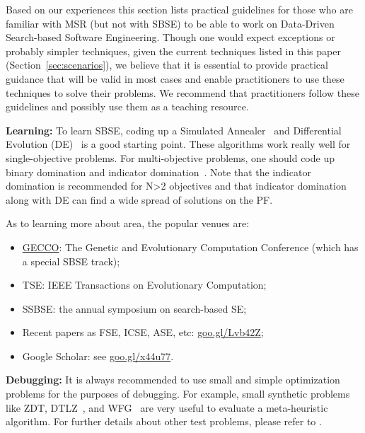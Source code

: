 \documentclass[sigconf,anonymous,review]{acmart}
\newcommand\TODO[1]{\textcolor{ScarletRed}{\textbf{\colorbox{yellow}{\small TODO:}} \emph{#1}}\xspace}
\begin{document}


Based on our experiences this section lists practical guidelines for those who are familiar with MSR (but not with SBSE) to be able to work on Data-Driven Search-based Software Engineering. 
Though one would expect exceptions or probably simpler techniques, given the current techniques listed in this paper (Section~\ref{sec:scenarios}), we believe that it is essential to provide practical guidance that will be valid in most cases and enable practitioners to use these techniques to solve their problems. 
We recommend that practitioners follow these guidelines and possibly use them as a teaching resource.

 
\noindent\textbf{Learning: } To learn SBSE, coding up a Simulated Annealer~\cite{van1987simulated} and Differential Evolution (DE)~\cite{storn97} is a good starting point.  These algorithms work really well for single-objective problems. For multi-objective problems, one should code up binary domination and indicator domination~\cite{zitzler2001spea2}. Note that the indicator domination is recommended for N>2 objectives and that indicator domination along with DE can find a wide spread of solutions on the PF. 

As to learning more about area, the popular venues are: 
\begin{itemize}[leftmargin=*]
\item \href{http://gecco-2018.sigevo.org/index.html/HomePage}{GECCO}: The Genetic and Evolutionary Computation Conference (which has a special SBSE track);
\item TSE: IEEE Transactions on Evolutionary Computation;
\item SSBSE: the annual symposium on search-based SE;
\item Recent papers   as FSE, ICSE, ASE, etc: \url{goo.gl/Lvb42Z};
\item Google Scholar: see  \url{goo.gl/x44u77}.
\end{itemize}
  \noindent\textbf{Debugging: } It is always recommended to use small and simple {optimization problems} for the purposes of debugging. For example, small synthetic {problems} like ZDT, DTLZ~\cite{deb2005scalable}, and WFG~\cite{huband2006review} are very useful to evaluate a meta-heuristic algorithm. For further details about other test problems, please refer to \cite{huband2006review}.  
  
\end{document}
